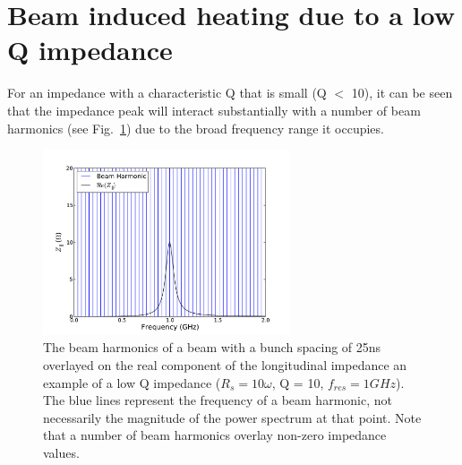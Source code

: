 
\section{Beam induced heating due to a low Q impedance}

For an impedance with a characteristic Q that is small (Q $<$ 10), it can be seen that the impedance peak will interact substantially with a number of beam harmonics (see Fig.~\ref{fig:low_q_harmonics}) due to the broad frequency range it occupies.

\begin{figure}
\begin{center}
\includegraphics[width=0.65\textwidth]{Wakefields_and_Impedances/figures/low_q_10_resonance_beam_harmonics.pdf}
\end{center}
\label{fig:low_q_harmonics}
\caption{The beam harmonics of a beam with a bunch spacing of 25ns overlayed on the real component of the longitudinal impedance an example of a low Q impedance ($R_{s}=10\omega$, Q = 10, $f_{res}=1GHz$). The blue lines represent the frequency of a beam harmonic, not necessarily the magnitude of the power spectrum at that point. Note that a number of beam harmonics overlay non-zero impedance values.}
\end{figure}

